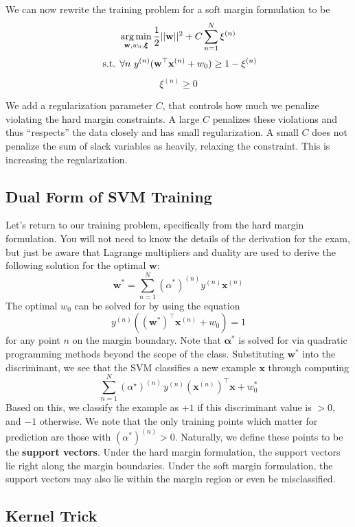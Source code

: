 \documentclass[11pt, letterpaper]{article}
\theoremstyle{definition}
\theoremstyle{plain}
\begin{document}
\noindent We can now rewrite
the training problem
for a soft margin formulation to be
%
$$
\argmin_{\boldw, w_0, \bm \xi} \frac{1}{2}{||\boldw||^2} + C\sum_{n=1}^N \xi^{(n)} $$
$$\text{ s.t. }\forall n \text{ } y^{(n)}(\mathbf{w}^\top\mathbf{x}^{(n)}+w_0) \geq 1 - \xi^{(n)}$$
$$ \xi^{(n)} \geq 0$$


\noindent We add a regularization parameter $C$, that controls how much we
penalize violating the hard margin constraints.
A large $C$ penalizes these violations and thus
``respects'' the data closely and has small regularization.  A small
$C$ does not penalize the sum of slack variables as heavily, relaxing
the constraint. This is increasing the regularization.

\subsection{Dual Form of SVM Training}
Let's return to our training problem, specifically from the hard margin formulation. You will not need to know the details of the derivation for the exam, but just be aware that Lagrange multipliers and duality are used to derive the following solution for the optimal $\bm w$:
\[\bm{w}^* = \sum_{n=1}^N (\alpha^*)^{(n)}y^{(n)}\bm{x}^{(n)}\]
The optimal $w_0$ can be solved for by using the equation
\[y^{(n)}((\bm{w}^*)^\top\bm{x}^{(n)} + w_0) = 1\]
for any point $n$ on the margin boundary. Note that $\bm{\alpha}^*$ is solved for via quadratic programming methods beyond the scope of the class. Substituting $\bm{w}^*$ into the discriminant, we see that the SVM classifies a new example $\bm{x}$ through computing
\[\sum_{n=1}^N (\alpha^\star)^{(n)} \,y^{(n)} (\bm{x}^{(n)})^\top \bm{x}+w_0^*\]
Based on this, we classify the example as $+1$ if this discriminant value is $>0$, and $-1$ otherwise. We note that the only training points which matter for prediction are those with $(\alpha^*)^{(n)} > 0$. Naturally, we define these points to be the \textbf{support vectors}. Under the hard margin formulation, the support vectors lie right along the margin boundaries. Under the soft margin formulation, the support vectors may also lie within the margin region or even be misclassified.

\subsection{Kernel Trick}
\end{document}
